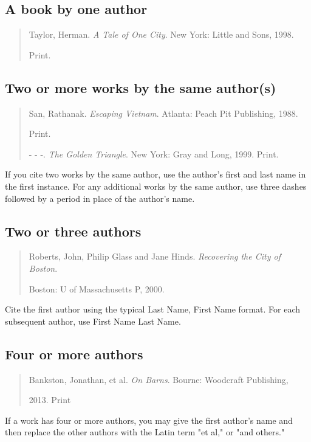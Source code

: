 \subsection{A book by one author}

\begin{quote}
Taylor, Herman. \emph{A Tale of One City}. New York: Little and Sons, 1998.
 
\hspace{.4in}Print.
\end{quote}
 
\subsection{Two or more works by the same author(s)}

\begin{quote}
San, Rathanak. \emph{Escaping Vietnam}. Atlanta: Peach Pit Publishing, 1988. 

\hspace{.4in}Print.

\medskip

- - -. \emph{The Golden Triangle}. New York: Gray and Long, 1999. Print.
\end{quote}

 If you cite two works by the same author, use the author's first and last name in the first instance. For any additional works by the same author, use three dashes followed by a period in place of the
author's name.

\subsection{Two or three authors}

\begin{quote}
Roberts, John, Philip Glass and Jane Hinds. \emph{Recovering the City of Boston}. 

\hspace{.4in}Boston: U of Massachusetts P, 2000.
\end{quote}
 Cite the first author using the typical Last Name, First Name format. For each subsequent author, use First Name Last Name.

\subsection{Four or more authors}

\begin{quote}

Bankston, Jonathan, et al. \emph{On Barns}. Bourne: Woodcraft Publishing,

\hspace{.4in}2013. Print

\end{quote}
 If a work has four or more authors, you may give the first author's name and then replace the other authors with the Latin term "et al," or "and others."

